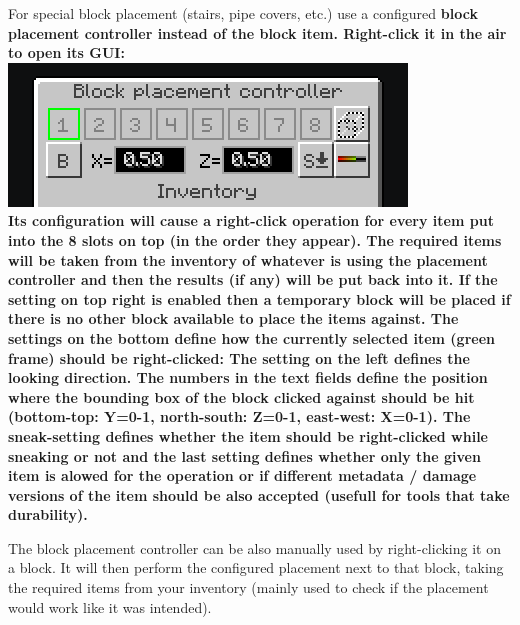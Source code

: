 \documentclass[11pt]{article} %
\begin{document}
For special block placement (stairs, pipe covers, etc.) use a configured \bf block placement controller \rm instead of the block item. Right-click it in the air to open its GUI: \\
\includegraphics[width = \textwidth]{placementController} \\
Its configuration will cause a right-click operation for every item put into the 8 slots on top (in the order they appear). The required items will be taken from the inventory of whatever is using the placement controller and then the results (if any) will be put back into it. If the setting on top right is enabled then a temporary block will be placed if there is no other block available to place the items against. The settings on the bottom define how the currently selected item (green frame) should be right-clicked: The setting on the left defines the looking direction. The numbers in the text fields define the position where the bounding box of the block clicked against should be hit (bottom-top: Y=0-1, north-south: Z=0-1, east-west: X=0-1). The sneak-setting defines whether the item should be right-clicked while sneaking or not and the last setting defines whether only the given item is alowed for the operation or if different metadata / damage versions of the item should be also accepted (usefull for tools that take durability).

The block placement controller can be also manually used by right-clicking it on a block. It will then perform the configured placement next to that block, taking the required items from your inventory (mainly used to check if the placement would work like it was intended).
\end{document}
